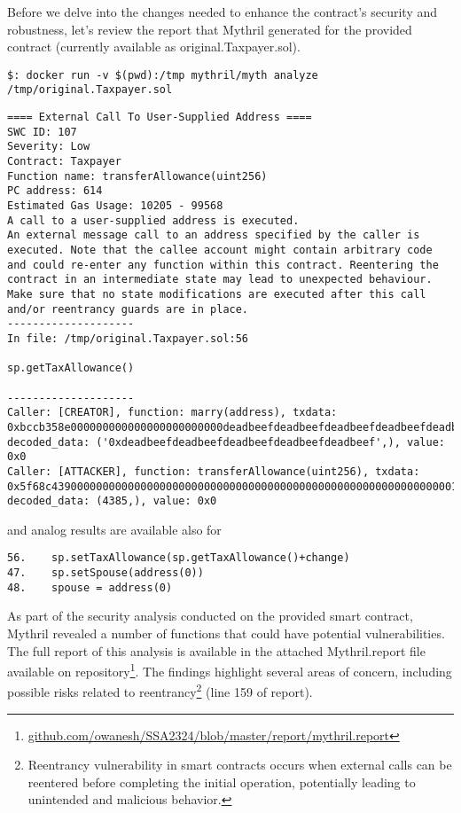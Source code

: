 \documentclass{article}
\begin{document}
Before we delve into the changes needed to enhance the contract's security and robustness, let's review the report that Mythril generated for the provided contract (currently available as original.Taxpayer.sol).
\begin{verbatim}
$: docker run -v $(pwd):/tmp mythril/myth analyze /tmp/original.Taxpayer.sol
\end{verbatim}
\begin{verbatim}
==== External Call To User-Supplied Address ====
SWC ID: 107
Severity: Low
Contract: Taxpayer
Function name: transferAllowance(uint256)
PC address: 614
Estimated Gas Usage: 10205 - 99568
A call to a user-supplied address is executed.
An external message call to an address specified by the caller is executed. Note that the callee account might contain arbitrary code and could re-enter any function within this contract. Reentering the contract in an intermediate state may lead to unexpected behaviour. Make sure that no state modifications are executed after this call and/or reentrancy guards are in place.
--------------------
In file: /tmp/original.Taxpayer.sol:56

sp.getTaxAllowance()

--------------------
Caller: [CREATOR], function: marry(address), txdata: 0xbccb358e000000000000000000000000deadbeefdeadbeefdeadbeefdeadbeefdeadbeef, decoded_data: ('0xdeadbeefdeadbeefdeadbeefdeadbeefdeadbeef',), value: 0x0
Caller: [ATTACKER], function: transferAllowance(uint256), txdata: 0x5f68c4390000000000000000000000000000000000000000000000000000000000001121, decoded_data: (4385,), value: 0x0
\end{verbatim}
and analog results are available also for
\begin{verbatim}
56.    sp.setTaxAllowance(sp.getTaxAllowance()+change)
47.    sp.setSpouse(address(0))
48.    spouse = address(0)
\end{verbatim}
As part of the security analysis conducted on the provided smart contract, Mythril revealed a number of functions that could have potential vulnerabilities. 
The full report of this analysis is available in the attached Mythril.report file available on repository\footnote{\href{https://github.com/Owanesh/SSA2324/blob/main/report/mythril.report}{github.com/owanesh/SSA2324/blob/master/report/mythril.report}}. 
The findings highlight several areas of concern, including possible risks related to 
reentrancy\footnote{Reentrancy vulnerability in smart contracts occurs when external calls can be reentered before completing the initial operation, potentially leading to unintended and malicious behavior.} (line 159 of report). 
\end{document}
